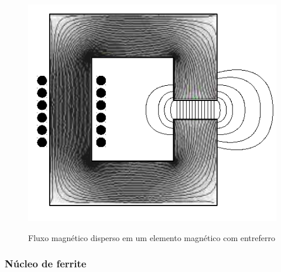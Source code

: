             \begin{figure}[H]
            	\centering
            	\caption{Fluxo magnético disperso em um elemento magnético com entreferro}
            	\includegraphics[scale=.8]{pdf/outros/entreferro.pdf}
            	\label{fig:entreferro}
            \end{figure}
            
            
            \subsubsection{Núcleo de ferrite} \label{cap:fund_emc_conv_mitig_choke}
            

